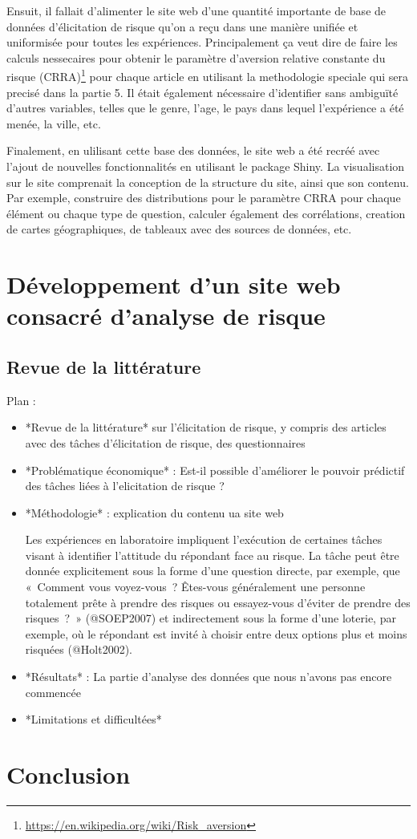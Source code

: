\documentclass[12pt]{article}
\begin{document}
Ensuit, il fallait d'alimenter le site web d'une quantité importante de
base de données d'élicitation de risque qu'on a reçu dans une manière
unifiée et uniformisée pour toutes les expériences. Principalement ça
veut dire de faire les calculs nessecaires pour obtenir le paramètre
d'aversion relative constante du risque (CRRA)\footnote{\url{https://en.wikipedia.org/wiki/Risk_aversion}}
pour chaque article en utilisant la methodologie speciale qui sera
precisé dans la partie 5. Il était également nécessaire d'identifier
sans ambiguïté d'autres variables, telles que le genre, l'age, le pays
dans lequel l'expérience a été menée, la ville, etc.

Finalement, en ulilisant cette base des données, le site web a été
recréé avec l'ajout de nouvelles fonctionnalités en utilisant le package
Shiny. La visualisation sur le site comprenait la conception de la
structure du site, ainsi que son contenu. Par exemple, construire des
distributions pour le paramètre CRRA pour chaque élément ou chaque type
de question, calculer également des corrélations, creation de cartes
géographiques, de tableaux avec des sources de données, etc.

\section{Développement d’un site web consacré d'analyse de risque}
\label{sec:fourth}

\subsection{Revue de la littérature}

Plan :

\begin{itemize}
\item  *Revue de la littérature* sur l'élicitation de risque, y compris des articles avec des tâches d'élicitation de risque, des questionnaires

\item  *Problématique économique* : Est-il possible d'améliorer le pouvoir prédictif des tâches liées à l'elicitation de risque ?

\item *Méthodologie* : explication du contenu ua site web

Les expériences en laboratoire impliquent l'exécution de certaines tâches visant à identifier l'attitude du répondant face au risque. La tâche peut être donnée explicitement sous la forme d'une question directe, par exemple, que « Comment vous voyez-vous ? Êtes-vous généralement une personne totalement prête à prendre des risques ou essayez-vous d'éviter de prendre des risques ? » (@SOEP2007) et indirectement sous la forme d'une loterie, par exemple, où le répondant est invité à choisir entre deux options plus et moins risquées (@Holt2002). 


\item *Résultats* : La partie d'analyse des données que nous n'avons pas encore commencée

\item *Limitations et difficultées*

\end{itemize}

\section{Conclusion}
\label{sec:fifth}



\end{document}
